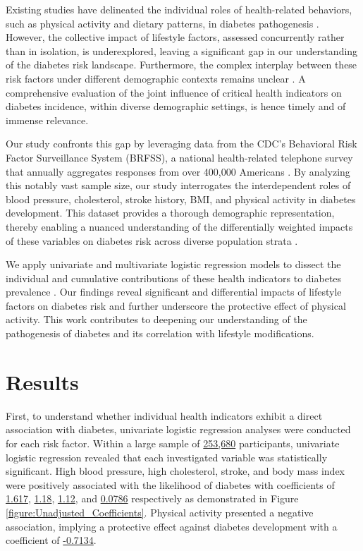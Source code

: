 \documentclass[11pt]{article}
\begin{document}
Existing studies have delineated the individual roles of health-related behaviors, such as physical activity and dietary patterns, in diabetes pathogenesis \cite{Ng2019SmokingDD, Kodama2013AssociationBP}. However, the collective impact of lifestyle factors, assessed concurrently rather than in isolation, is underexplored, leaving a significant gap in our understanding of the diabetes risk landscape. Furthermore, the complex interplay between these risk factors under different demographic contexts remains unclear \cite{Hjerkind2017AdiposityPA, Bays2007TheRO, Shostrom2017HistoryOG}. A comprehensive evaluation of the joint influence of critical health indicators on diabetes incidence, within diverse demographic settings, is hence timely and of immense relevance.

Our study confronts this gap by leveraging data from the CDC's Behavioral Risk Factor Surveillance System (BRFSS), a national health-related telephone survey that annually aggregates responses from over 400,000 Americans \cite{Preedy1989BehavioralRF, Merrick2018PrevalenceOA}. By analyzing this notably vast sample size, our study interrogates the interdependent roles of blood pressure, cholesterol, stroke history, BMI, and physical activity in diabetes development. This dataset provides a thorough demographic representation, thereby enabling a nuanced understanding of the differentially weighted impacts of these variables on diabetes risk across diverse population strata \cite{Mirbolouk2018PrevalenceAD, Heslin2021SexualOD}.

We apply univariate and multivariate logistic regression models to dissect the individual and cumulative contributions of these health indicators to diabetes prevalence \cite{Fernandez2004MultivariateAO}. Our findings reveal significant and differential impacts of lifestyle factors on diabetes risk and further underscore the protective effect of physical activity. This work contributes to deepening our understanding of the pathogenesis of diabetes and its correlation with lifestyle modifications.

\section*{Results}

First, to understand whether individual health indicators exhibit a direct association with diabetes, univariate logistic regression analyses were conducted for each risk factor. Within a large sample of \hyperlink{R0a}{253,680} participants, univariate logistic regression revealed that each investigated variable was statistically significant. High blood pressure, high cholesterol, stroke, and body mass index were positively associated with the likelihood of diabetes with coefficients of \hyperlink{A0a}{1.617}, \hyperlink{A1a}{1.18}, \hyperlink{A2a}{1.12}, and \hyperlink{A3a}{0.0786} respectively as demonstrated in Figure \ref{figure:Unadjusted_Coefficients}. Physical activity presented a negative association, implying a protective effect against diabetes development with a coefficient of \hyperlink{A4a}{-0.7134}.
\end{document}
